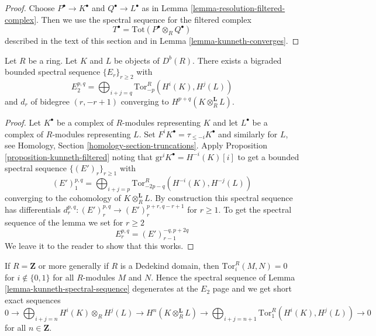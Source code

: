 \begin{proof}
Choose $P^\bullet \to K^\bullet$ and $Q^\bullet \to L^\bullet$ as in
Lemma \ref{lemma-resolution-filtered-complex}. Then we use the spectral
sequence for the filtered complex
$$
T^\bullet = \text{Tot}(P^\bullet \otimes_R Q^\bullet)
$$
described in the text of this section and in
Lemma \ref{lemma-kunneth-converges}.
\end{proof}

\begin{lemma}
\label{lemma-kunneth-spectral-sequence}
Let $R$ be a ring. Let $K$ and $L$ be objects of $D^b(R)$.
There exists a bigraded bounded spectral sequence $\{E_r\}_{r \geq 2}$
with
$$
E_2^{p, q} = \bigoplus\nolimits_{i + j = q} \text{Tor}^R_{-p}(H^i(K), H^j(L))
$$
and $d_r$ of bidegree $(r, -r + 1)$
converging to $H^{p + q}(K \otimes_R^\mathbf{L} L)$.
\end{lemma}

\begin{proof}
Let $K^\bullet$ be a complex of $R$-modules representing $K$ and let
$L^\bullet$ be a complex of $R$-modules representing $L$. Set
$F^iK^\bullet = \tau_{\leq -i}K^\bullet$ and similarly for $L$, see
Homology, Section \ref{homology-section-truncations}. Apply
Proposition \ref{proposition-kunneth-filtered} noting that
$\text{gr}^iK^\bullet = H^{-i}(K)[i]$ to get a bounded
spectral sequence $\{(E')_r\}_{r \geq 1}$ with
$$
(E')^{p, q}_1 =
\bigoplus\nolimits_{i + j = p} \text{Tor}^R_{-2p - q}(H^{-i}(K), H^{-j}(L))
$$
converging to the cohomology of $K \otimes_R^\mathbf{L} L$. By
construction this spectral sequence has differentials
$d_r^{p, q} : (E')_r^{p, q} \to (E')_r^{p + r, q - r + 1}$ for $r \geq 1$.
To get the spectral sequence of the lemma we set for $r \geq 2$
$$
E_r^{p, q} = (E')_{r - 1}^{-q, p + 2q}
$$
We leave it to the reader to show that this works.
\end{proof}

\begin{example}
\label{example-kunneth-dedekind}
If $R = \mathbf{Z}$ or more generally if $R$ is a Dedekind domain, then
$\text{Tor}_i^R(M, N) = 0$ for $i \not \in \{0, 1\}$ for all $R$-modules
$M$ and $N$. Hence the spectral sequence of
Lemma \ref{lemma-kunneth-spectral-sequence} degenerates
at the $E_2$ page and we get short exact sequences
$$
0 \to \bigoplus_{i + j = n} H^i(K) \otimes_R H^j(L) \to
H^n(K \otimes_R^\mathbf{L} L) \to
\bigoplus_{i + j = n + 1} \text{Tor}^R_1(H^i(K), H^j(L)) \to 0
$$
for all $n \in \mathbf{Z}$.
\end{example}






